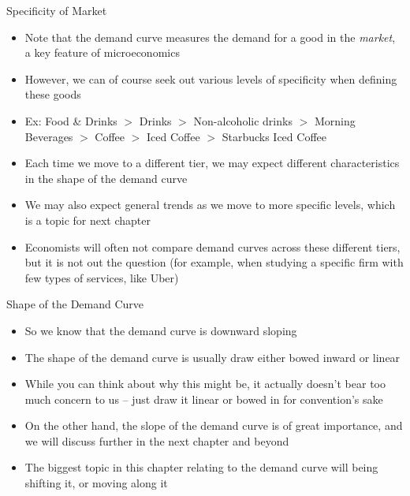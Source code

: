 \documentclass[10pt,xcolor={svgnames}]{beamer}
\begin{document}
\begin{frame}{Specificity of Market}
\begin{itemize}[<+->]
    \item Note that the demand curve measures the demand for a good in the \textit{market}, a key feature of microeconomics
    \item However, we can of course seek out various levels of specificity when defining these goods
    \item Ex: Food \& Drinks $>$ Drinks $>$ Non-alcoholic drinks $>$ Morning Beverages $>$ Coffee $>$ Iced Coffee $>$ Starbucks Iced Coffee
    \item Each time we move to a different tier, we may expect different characteristics in the shape of the demand curve
    \item We may also expect general trends as we move to more specific levels, which is a topic for next chapter
    \item Economists will often not compare demand curves across these different tiers, but it is not out the question (for example, when studying a specific firm with few types of services, like Uber)
\end{itemize}
\end{frame}

\begin{frame}{Shape of the Demand Curve}
    \begin{itemize}[<+->]
        \item So we know that the demand curve is downward sloping
        \item The shape of the demand curve is usually draw either bowed inward or linear
        \item While you can think about why this might be, it actually doesn't bear too much concern to us -- just draw it linear or bowed in for convention's sake
        \item On the other hand, the slope of the demand curve is of great importance, and we will discuss further in the next chapter and beyond
        \item The biggest topic in this chapter relating to the demand curve will being shifting it, or moving along it
    \end{itemize}
\end{frame}
\end{document}
